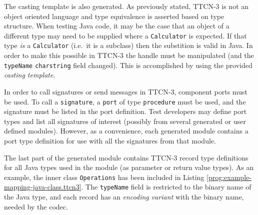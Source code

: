 The casting template is also generated.
As previously stated, \ac{TTCN-3} is not an object oriented language
and type equivalence is asserted based on type structure.
When testing Java code, it may be the case that an object of a different type
may need to be supplied where a \verb=Calculator= is expected.
If that type \emph{is} a \verb=Calculator= (i.e.\ it is a subclass)
then the substition is valid in Java.
In order to make this possible in \ac{TTCN-3} the handle must
be manipulated (and the \verb=typeName= \verb=charstring= field changed).
This is accomplished by using the provided \emph{casting template}.

In order to call signatures or send messages in \ac{TTCN-3},
component ports must be used.
To call a \verb=signature=, a \verb=port= of type \verb=procedure=
must be used, and the signature must be listed in the port definition.
Test developers may define port types and list all signatures of interest
(possibly from several generated or user defined modules).
However, as a convenience,
each generated module contains a port type definition
for use with all the signatures from that module.

The last part of the generated module contains
\ac{TTCN-3} record type definitions for all Java types used in the module
(as parameter or return value types).
As an example, the inner class \verb=Operations= has been included in
Listing \ref{prog:example-mapping-java-class.ttcn3}.
The \verb=typeName= field is restricted to the binary name of the Java type,
and each record has an \emph{encoding variant} with the binary name,
needed by the codec.
